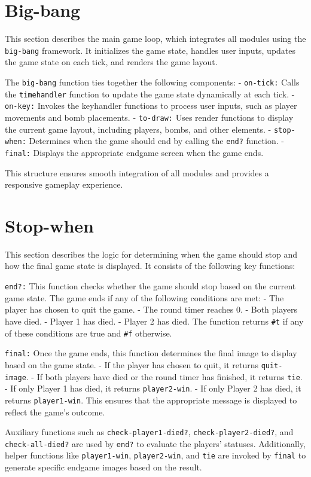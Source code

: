 \documentclass[12pt]{article}
\begin{document}
\section{Big-bang}
\hspace{1.27cm}This section describes the main game loop, which integrates all modules using the \texttt{big-bang} framework. It initializes the game state, handles user inputs, updates the game state on each tick, and renders the game layout.

The \texttt{big-bang} function ties together the following components:
- \texttt{on-tick:} Calls the \texttt{timehandler} function to update the game state dynamically at each tick.
- \texttt{on-key:} Invokes the keyhandler functions to process user inputs, such as player movements and bomb placements.
- \texttt{to-draw:} Uses render functions to display the current game layout, including players, bombs, and other elements.
- \texttt{stop-when:} Determines when the game should end by calling the \texttt{end?} function.
- \texttt{final:} Displays the appropriate endgame screen when the game ends.

This structure ensures smooth integration of all modules and provides a responsive gameplay experience.

\section{Stop-when}
\hspace{1.27cm}This section describes the logic for determining when the game should stop and how the final game state is displayed. It consists of the following key functions:

\texttt{end?:} This function checks whether the game should stop based on the current game state. The game ends if any of the following conditions are met:
- The player has chosen to quit the game.
- The round timer reaches 0.
- Both players have died.
- Player 1 has died.
- Player 2 has died.
The function returns \texttt{\#t} if any of these conditions are true and \texttt{\#f} otherwise.

\texttt{final:} Once the game ends, this function determines the final image to display based on the game state. 
- If the player has chosen to quit, it returns \texttt{quit-image}.
- If both players have died or the round timer has finished, it returns \texttt{tie}.
- If only Player 1 has died, it returns \texttt{player2-win}.
- If only Player 2 has died, it returns \texttt{player1-win}.
This ensures that the appropriate message is displayed to reflect the game's outcome.

Auxiliary functions such as \texttt{check-player1-died?}, \texttt{check-player2-died?}, and \texttt{check-all-died?} are used by \texttt{end?} to evaluate the players' statuses. Additionally, helper functions like \texttt{player1-win}, \texttt{player2-win}, and \texttt{tie} are invoked by \texttt{final} to generate specific endgame images based on the result.
\end{document}
